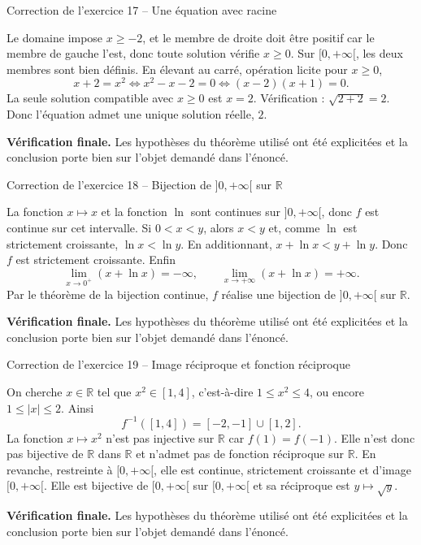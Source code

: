 \documentclass[11pt,a4paper]{article}
\newcommand{\R}{\mathbb{R}}
\begin{document}
\begin{corrbox}{Correction de l'exercice 17 -- Une équation avec racine}

Le domaine impose $x\geq-2$, et le membre de droite doit être positif car le membre de gauche l'est, donc toute solution vérifie $x\geq0$. Sur $[0,+\infty[$, les deux membres sont bien définis. En élevant au carré, opération licite pour $x\geq0$,
\[
x+2=x^2\Longleftrightarrow x^2-x-2=0\Longleftrightarrow (x-2)(x+1)=0.
\]
La seule solution compatible avec $x\geq0$ est $x=2$. Vérification : $\sqrt{2+2}=2$. Donc l'équation admet une unique solution réelle, $2$.

\medskip
\textbf{Vérification finale.} Les hypothèses du théorème utilisé ont été explicitées et la conclusion porte bien sur l'objet demandé dans l'énoncé.
\end{corrbox}


\begin{corrbox}{Correction de l'exercice 18 -- Bijection de $]0,+\infty[$ sur $\R$}

La fonction $x\mapsto x$ et la fonction $\ln$ sont continues sur $]0,+\infty[$, donc $f$ est continue sur cet intervalle. Si $0<x<y$, alors $x<y$ et, comme $\ln$ est strictement croissante, $\ln x<\ln y$. En additionnant, $x+\ln x<y+\ln y$. Donc $f$ est strictement croissante. Enfin
\[
\lim_{x\to0^+}(x+\ln x)=-\infty,
\qquad
\lim_{x\to+\infty}(x+\ln x)=+\infty.
\]
Par le théorème de la bijection continue, $f$ réalise une bijection de $]0,+\infty[$ sur $\R$.

\medskip
\textbf{Vérification finale.} Les hypothèses du théorème utilisé ont été explicitées et la conclusion porte bien sur l'objet demandé dans l'énoncé.
\end{corrbox}


\begin{corrbox}{Correction de l'exercice 19 -- Image réciproque et fonction réciproque}

On cherche $x\in\R$ tel que $x^2\in[1,4]$, c'est-à-dire $1\leq x^2\leq4$, ou encore $1\leq |x|\leq2$. Ainsi
\[
f^{-1}([1,4])=[-2,-1]\cup[1,2].
\]
La fonction $x\mapsto x^2$ n'est pas injective sur $\R$ car $f(1)=f(-1)$. Elle n'est donc pas bijective de $\R$ dans $\R$ et n'admet pas de fonction réciproque sur $\R$. En revanche, restreinte à $[0,+\infty[$, elle est continue, strictement croissante et d'image $[0,+\infty[$. Elle est bijective de $[0,+\infty[$ sur $[0,+\infty[$ et sa réciproque est $y\mapsto\sqrt y$.

\medskip
\textbf{Vérification finale.} Les hypothèses du théorème utilisé ont été explicitées et la conclusion porte bien sur l'objet demandé dans l'énoncé.
\end{corrbox}
\end{document}
